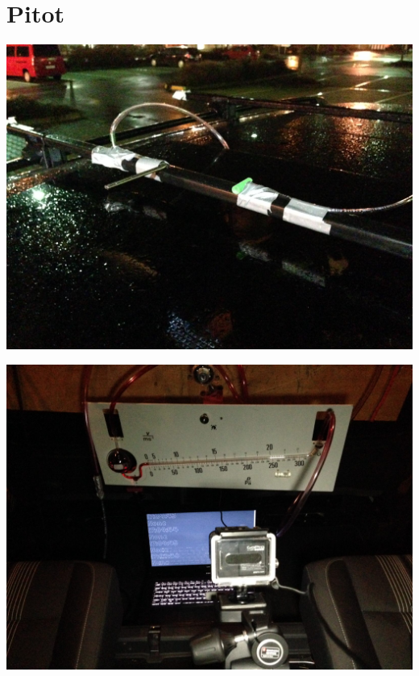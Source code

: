 \documentclass[compress,11pt]{beamer}
\begin{document}
\section{Pitot}
\begin{frame}
	\includegraphics[width=\textwidth]{images/3/IMG_0004}
\end{frame}

\begin{frame}
	\includegraphics[width=\textwidth]{images/3/IMG_0007}
\end{frame}
\end{document}
